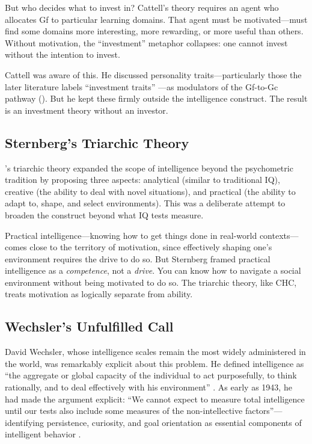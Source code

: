 \documentclass[12pt,a4paper]{article}
\begin{document}
But who decides what to invest in? Cattell's theory requires an agent who allocates Gf to particular learning domains. That agent must be motivated---\hspace{0pt}must find some domains more interesting, more rewarding, or more useful than others. Without motivation, the ``investment'' metaphor collapses: one cannot invest without the intention to invest.

Cattell was aware of this. He discussed personality traits---\hspace{0pt}particularly those the later literature labels ``investment traits'' \citep{Ackerman1996}---\hspace{0pt}as modulators of the Gf-to-Gc pathway (\citealp[see also][on the relationship between investment traits and intelligence]{Ziegler2012}). But he kept these firmly outside the intelligence construct. The result is an investment theory without an investor.

\subsection{Sternberg's Triarchic Theory}

\citeauthor{Sternberg1985}'s \citeyearpar{Sternberg1985} triarchic theory expanded the scope of intelligence beyond the psychometric tradition by proposing three aspects: analytical (similar to traditional IQ), creative (the ability to deal with novel situations), and practical (the ability to adapt to, shape, and select environments). This was a deliberate attempt to broaden the construct beyond what IQ tests measure.

Practical intelligence---\hspace{0pt}knowing how to get things done in real-world contexts---\hspace{0pt}comes close to the territory of motivation, since effectively shaping one's environment requires the drive to do so. But Sternberg framed practical intelligence as a \emph{competence}, not a \emph{drive}. You can know how to navigate a social environment without being motivated to do so. The triarchic theory, like CHC, treats motivation as logically separate from ability.

\subsection{Wechsler's Unfulfilled Call}

David Wechsler, whose intelligence scales remain the most widely administered in the world, was remarkably explicit about this problem. He defined intelligence as ``the aggregate or global capacity of the individual to act purposefully, to think rationally, and to deal effectively with his environment'' \citep[p.~3]{Wechsler1944}. As early as 1943, he had made the argument explicit: ``We cannot expect to measure total intelligence until our tests also include some measures of the non-intellective factors''---\hspace{0pt}identifying persistence, curiosity, and goal orientation as essential components of intelligent behavior \citep{Wechsler1943}.
\end{document}
